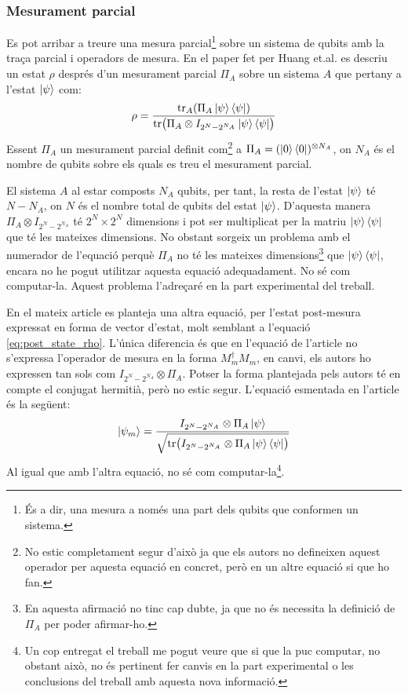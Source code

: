 \subsubsection{Mesurament parcial}
\label{par_measurament}
Es pot arribar a treure una mesura parcial\footnote{És a dir, una mesura a només una part dels qubits que conformen un sistema.} sobre un sistema de qubits amb la traça parcial i operadors de mesura. En el paper fet per Huang et.al. \cite{QGAN_exp} es descriu un estat $\rho$ després d'un mesurament parcial $\Pi_A$ sobre un sistema $A$ que pertany a l'estat $\ket{\psi}$ com:
$$
\rho = \frac{\tr_A(\Pi_A \ket{\psi}\bra{\psi})}{\tr(\Pi_A\otimes I_{2^N-2^{N_A}}\ket{\psi}\bra{\psi})}
$$
Essent $\Pi_{A}$ un mesurament parcial definit com\footnote{No estic completament segur d'això ja que els autors no defineixen aquest operador per aquesta equació en concret, però en un altre equació si que ho fan.} a $\Pi_{A}=(\ket{0}\bra{0})^{\otimes N_{A}}$, on $N_{A}$ és el nombre de qubits sobre els quals es treu el mesurament parcial.

El sistema $A$ al estar composts $N_A$ qubits, per tant, la resta de l'estat $\ket{\psi}$ té $N-N_A$, on $N$ és el nombre total de qubits del estat $\ket{\psi}$. D'aquesta manera $\Pi_A\otimes I_{2^N-2^{N_A}}$ té $2^N\times 2^N$ dimensions i pot ser multiplicat per la matriu $\ket{\psi}\bra{\psi}$ que té les mateixes dimensions. No obstant sorgeix un problema amb el numerador de l'equació perquè $\Pi_A$ no té les mateixes dimensions\footnote{En aquesta afirmació no tinc cap dubte, ja que no és necessita la definició de $\Pi_{A}$ per poder afirmar-ho.} que $\ket{\psi}\bra{\psi}$, encara no he pogut utilitzar aquesta equació adequadament. No sé com computar-la. Aquest problema l'adreçaré en la part experimental del treball.

En el mateix article es planteja una altra equació, per l'estat post-mesura expressat en forma de vector d'estat, molt semblant a l'equació \ref{eq:post_state_rho}. L'única diferencia és que en l'equació de l'article no s'expressa l'operador de mesura en la forma $M_m^\dagger M_m$, en canvi, els autors ho expressen tan sols com $I_{2^N-2^{N_A}}\otimes \Pi_A$. Potser la forma plantejada pels autors té en compte el conjugat hermitià, però no estic segur.
L'equació esmentada en l'article és la següent:
$$
\ket{\psi_m} = \frac{I_{2^N-2^{N_A}}\otimes\Pi_A\ket{\psi}}{\sqrt{\tr(I_{2^N-2^{N_A}}\otimes\Pi_A\ket{\psi}\bra{\psi})}}
$$
Al igual que amb l'altra equació, no sé com computar-la\footnote{Un cop entregat el treball me pogut veure que si que la puc computar, no obstant això, no és pertinent fer canvis en la part experimental o les conclusions del treball amb aquesta nova informació. }.

